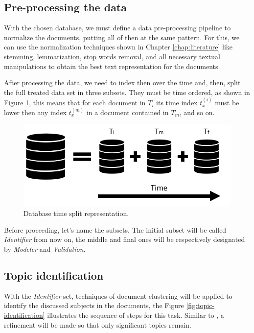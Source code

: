 \subsection{Pre-processing the data}

With the chosen database, we must define a data pre-processing pipeline to normalize the documents, putting all of then at the same pattern. For this, we can use the normalization techniques shown in Chapter \ref{chap:literature} like stemming, lemmatization, stop words removal, and all necessary textual manipulations to obtain the best text representation for the documents.

After processing the data, we need to index then over the time and, then, split the full treated data set in three subsets. They must be time ordered, as shown in Figure \ref{fig:database}, this means that for each document in $T_{i}$ its time index $t_{x}^{(i)}$ must be lower then any index $t_{x}^{(m)}$ in a document contained in $T_{m}$, and so on.

\begin{figure}[h!]
	\centering
	\includegraphics[width=0.6\linewidth]{01.Chapters/04.Materials/database}
	\caption{Database time split representation.}
	\label{fig:database}
\end{figure}

Before proceeding, let's name the subsets. The initial subset will be called \textit{Identifier} from now on, the middle and final ones will be respectively designated by \textit{Modeler} and \textit{Validation}. 

\subsection{Topic identification}

With the \textit{Identifier} set, techniques of document clustering will be applied to identify the discussed subjects in the documents, the Figure \ref{fig:topic-identification} illustrates the sequence of steps for this task. Similar to , a refinement will be made so that only significant topics remain. 

